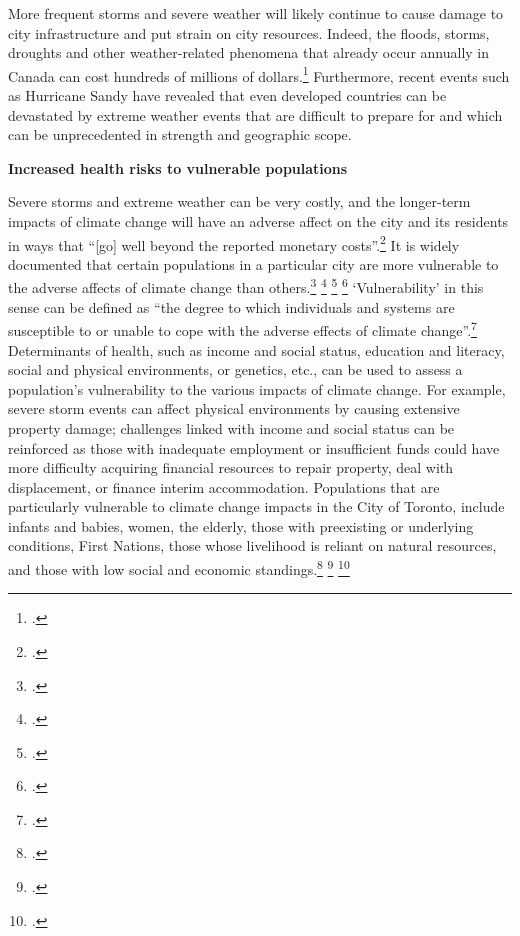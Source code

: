 More frequent storms and severe weather will likely continue to cause damage to city infrastructure and put strain on city resources. 
Indeed, the floods, storms, droughts and other weather-related phenomena that already occur annually in Canada can cost hundreds of millions of dollars.\footcite[][p. 11]{HHInACC}
Furthermore, recent events such as Hurricane Sandy have revealed that even developed countries can be devastated by extreme weather events that are difficult to prepare for and which can be unprecedented in strength and geographic scope.   



\textbf{Increased health risks to vulnerable populations}



Severe storms and extreme weather can be very costly, and the longer-term impacts of climate change will have an adverse affect on the city and its residents in ways that ``[go] well beyond the reported monetary costs''.\footcite[][p. 19]{CCAHealthEquity}
It is widely documented that certain populations in a particular city are more vulnerable to the adverse affects of climate change than others.\footcite[][]{EbiHealthJustice} \footcite[][]{HotWeatherResponse2006} \footcite[][p. 1153--1163]{MarmotHealthOutcomes} \footcite[][]{ReducingHealthDisparities}
`Vulnerability' in this sense can be defined as ``the degree to which individuals and systems are susceptible to or unable to cope with the adverse effects of climate change''.\footcite[][p. 6]{CCAHealthEquity}
Determinants of health, such as income and social status, education and literacy, social and physical environments, or genetics, etc., can be used to assess a population's vulnerability to the various impacts of climate change. 
For example, severe storm events can affect physical environments by causing extensive property damage; challenges linked with income and social status can be reinforced as those with inadequate employment or insufficient funds could have more difficulty acquiring financial resources to repair property, deal with displacement, or finance interim accommodation. 
Populations that are particularly vulnerable to climate change impacts in the City of Toronto, include infants and babies, women, the elderly, those with preexisting or underlying conditions, First Nations, those whose livelihood is reliant on natural resources, and those with low social and economic standings.\footcite{CCAHealthEquity} \footcite[][]{HHInACC} \footcite[][]{HealthCanadaPreparingImpacts}



